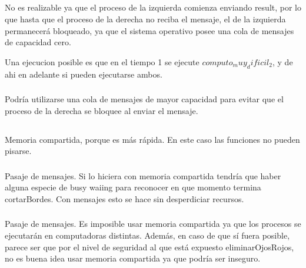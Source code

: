 \subsection{}

\subsubsection{}

No es realizable ya que el proceso de la izquierda comienza enviando result,
por lo que hasta que el proceso de la derecha no reciba el mensaje, el de la
izquierda permanecerá bloqueado, ya que el sistema operativo posee una cola de
mensajes de capacidad cero.

Una ejecucion posible es que en el tiempo 1 se ejecute
$computo_muy_dificil_2$, y de ahi en adelante si pueden ejecutarse ambos.

\subsubsection{}

Podría utilizarse una cola de mensajes de mayor capacidad para evitar que el
proceso de la derecha se bloquee al enviar el mensaje.

\subsection{}

\subsubsection{}

Memoria compartida, porque es más rápida. En este caso las funciones no pueden
pisarse.

\subsubsection{}

Pasaje de mensajes. Si lo hiciera con memoria compartida tendría que haber
alguna especie de busy waiing para reconocer en que momento termina
cortarBordes. Con mensajes esto se hace sin desperdiciar recursos.

\subsubsection{}

Pasaje de mensajes. Es imposible usar memoria compartida ya que los procesos
se ejecutarán en computadoras distintas. Además, en caso de que sí fuera
posible, parece ser que por el nivel de seguridad al que está expuesto
eliminarOjosRojos, no es buena idea usar memoria compartida ya que podría ser
inseguro.

